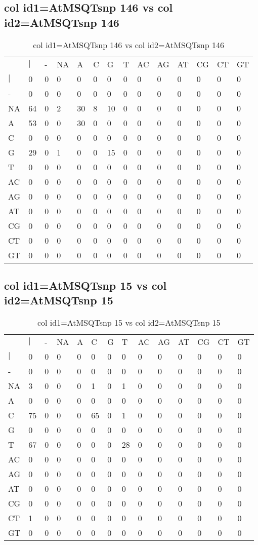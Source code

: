 \subsection{col id1=AtMSQTsnp 146 vs col id2=AtMSQTsnp 146}
\begin{center}
\begin{longtable}{|l|l|l|l|l|l|l|l|l|l|l|l|l|l|}
\caption{col id1=AtMSQTsnp 146 vs col id2=AtMSQTsnp 146} \label{table_dm528}\\
\hline
\\
\hline
&$|$&-&NA&A&C&G&T&AC&AG&AT&CG&CT&GT\\
$|$&0&0&0&0&0&0&0&0&0&0&0&0&0\\
-&0&0&0&0&0&0&0&0&0&0&0&0&0\\
NA&64&0&2&30&8&10&0&0&0&0&0&0&0\\
A&53&0&0&30&0&0&0&0&0&0&0&0&0\\
C&0&0&0&0&0&0&0&0&0&0&0&0&0\\
G&29&0&1&0&0&15&0&0&0&0&0&0&0\\
T&0&0&0&0&0&0&0&0&0&0&0&0&0\\
AC&0&0&0&0&0&0&0&0&0&0&0&0&0\\
AG&0&0&0&0&0&0&0&0&0&0&0&0&0\\
AT&0&0&0&0&0&0&0&0&0&0&0&0&0\\
CG&0&0&0&0&0&0&0&0&0&0&0&0&0\\
CT&0&0&0&0&0&0&0&0&0&0&0&0&0\\
GT&0&0&0&0&0&0&0&0&0&0&0&0&0\\
\hline
\end{longtable}
\end{center}

\subsection{col id1=AtMSQTsnp 15 vs col id2=AtMSQTsnp 15}
\begin{center}
\begin{longtable}{|l|l|l|l|l|l|l|l|l|l|l|l|l|l|}
\caption{col id1=AtMSQTsnp 15 vs col id2=AtMSQTsnp 15} \label{table_dm530}\\
\hline
\\
\hline
&$|$&-&NA&A&C&G&T&AC&AG&AT&CG&CT&GT\\
$|$&0&0&0&0&0&0&0&0&0&0&0&0&0\\
-&0&0&0&0&0&0&0&0&0&0&0&0&0\\
NA&3&0&0&0&1&0&1&0&0&0&0&0&0\\
A&0&0&0&0&0&0&0&0&0&0&0&0&0\\
C&75&0&0&0&65&0&1&0&0&0&0&0&0\\
G&0&0&0&0&0&0&0&0&0&0&0&0&0\\
T&67&0&0&0&0&0&28&0&0&0&0&0&0\\
AC&0&0&0&0&0&0&0&0&0&0&0&0&0\\
AG&0&0&0&0&0&0&0&0&0&0&0&0&0\\
AT&0&0&0&0&0&0&0&0&0&0&0&0&0\\
CG&0&0&0&0&0&0&0&0&0&0&0&0&0\\
CT&1&0&0&0&0&0&0&0&0&0&0&0&0\\
GT&0&0&0&0&0&0&0&0&0&0&0&0&0\\
\hline
\end{longtable}
\end{center}

